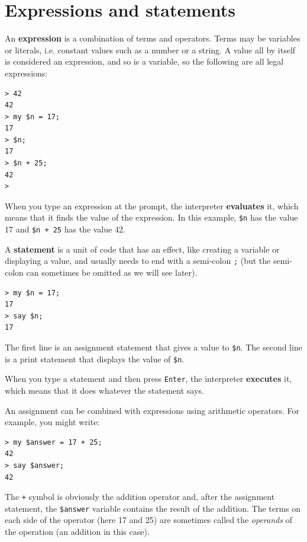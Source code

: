 \section{Expressions and statements}
\label{expr_and_statements}

An {\bf expression} is a combination of terms and operators.
Terms may be variables or literals, i.e. constant values such as a number or a string. A value all by itself is considered an expression, and so is
a variable, so the following are all legal expressions:

\begin{verbatim}
> 42
42
> my $n = 17;
17
> $n;
17
> $n + 25;
42
>
\end{verbatim}
%
When you type an expression at the prompt, the interpreter
{\bf evaluates} it, which means that it finds the value of
the expression.
In this example, {\tt \$n} has the value 17 and
{\tt \$n + 25} has the value 42.

A {\bf statement} is a unit of code that has an effect, like
creating a variable or displaying a value, and usually needs to end 
with a semi-colon {\tt ;} (but the semi-colon can sometimes be omitted 
as we will see later).  

\begin{verbatim}
> my $n = 17;
17
> say $n;
17
\end{verbatim}
%

The first line is an assignment statement that gives a value to
{\tt \$n}.  The second line is a print statement that displays the
value of {\tt \$n}.

When you type a statement and then press {\tt Enter}, the 
interpreter {\bf executes} it, which means that it does 
whatever the statement says.

An assignment can be combined with expressions using arithmetic 
operators. For example, you might write:

\begin{verbatim}
> my $answer = 17 + 25;
42
> say $answer;
42
\end{verbatim}
%

The \verb'+' symbol is obviously the addition operator 
and, after the assignment statement, the \verb'$answer' 
variable contains the result 
of the addition. The terms on each side of the operator 
(here 17 and 25) are sometimes called the \emph{operands} 
of the operation (an addition in this case).

